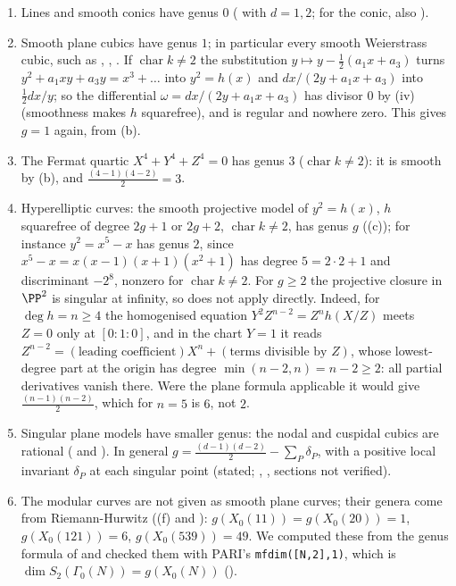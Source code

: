 \begin{example}[genera]\label{ex:curves:genus-examples}
\leavevmode
\begin{enumerate}[label=(\alph*)]
\item Lines and smooth conics have genus $0$ ( with $d=1,2$; for the conic, also ).
\item Smooth plane cubics have genus $1$; in particular every smooth Weierstrass cubic, such as , , . If $\operatorname{char}k\ne2$ the
substitution $y\mapsto y-\frac12(a_1x+a_3)$ turns $y^2+a_1xy+a_3y=x^3+\dots$ into $y^2=h(x)$ and $dx/(2y+a_1x+a_3)$ into $\frac12dx/y$; so the differential
$\omega=dx/(2y+a_1x+a_3)$ has divisor $0$ by (iv) (smoothness makes $h$ squarefree), and is regular and nowhere zero.
This gives $g=1$ again, from (b).
\item The Fermat quartic $X^4+Y^4+Z^4=0$ has genus $3$ ($\operatorname{char}k\ne2$): it is smooth by (b), and
$\frac{(4-1)(4-2)}2=3$.
\item Hyperelliptic curves: the smooth projective model of $y^2=h(x)$, $h$ squarefree of degree $2g+1$ or $2g+2$, $\operatorname{char}k\ne2$, has genus $g$
((c)); for instance $y^2=x^5-x$ has genus $2$, since $x^5-x=x(x-1)(x+1)(x^2+1)$ has degree $5=2\cdot2+1$ and
discriminant $-2^8$, nonzero for $\operatorname{char}k\ne2$. For $g\ge2$ the projective closure in $\PP^2$ is singular at infinity, so
 does not apply directly. Indeed, for $\deg h=n\ge4$ the homogenised equation $Y^2Z^{n-2}=Z^nh(X/Z)$ meets $Z=0$ only at
$[0:1:0]$, and in the chart $Y=1$ it reads $Z^{n-2}=(\text{leading coefficient})X^n+(\text{terms divisible by }Z)$, whose lowest-degree part at the origin
has degree $\min(n-2,n)=n-2\ge2$: all partial derivatives vanish there. Were the plane formula applicable it would give $\frac{(n-1)(n-2)}2$, which
for $n=5$ is $6$, not $2$.
\item Singular plane models have smaller genus: the nodal and cuspidal cubics are rational ( and
). In general $g=\frac{(d-1)(d-2)}2-\sum_P\delta_P$, with a positive local invariant $\delta_P$ at each singular point (stated;
\cite[Chapter 7]{Fulton}, \cite[Chapter IV, Section 1]{Hartshorne}, sections not verified).
\item The modular curves are not given as smooth plane curves; their genera come from Riemann-Hurwitz ((f) and
): $g(X_0(11))=g(X_0(20))=1$, $g(X_0(121))=6$, $g(X_0(539))=49$. We computed these from the genus formula of  and checked
them with PARI's \texttt{mfdim([N,2],1)}, which is $\dim S_2(\Gamma_0(N))=g(X_0(N))$ ().
\end{enumerate}
\end{example}

